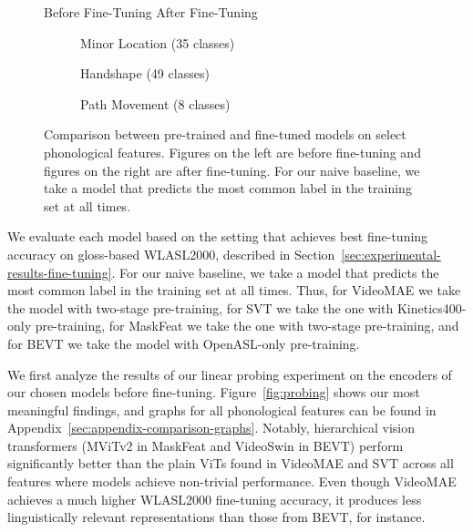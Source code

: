 \begin{figure*}
    \caption*{\hspace{0.5in} Before Fine-Tuning \hspace{2in} After Fine-Tuning}
    \begin{subfigure}[b]{\linewidth}
        \centering
        \renewcommand\sffamily{}
        
        \caption{Minor Location (35 classes)}
        \label{fig:comparison-min-loc}
    \end{subfigure}

    \begin{subfigure}[b]{\linewidth}
        \centering
        \renewcommand\sffamily{}
        
        \caption{Handshape (49 classes)}
        \label{fig:comparison-handshape}
    \end{subfigure}

    \begin{subfigure}[b]{\linewidth}
        \centering
        \renewcommand\sffamily{}
        
        \caption{Path Movement (8 classes)}
        \label{fig:comparison-path-mov}
    \end{subfigure}
    
    \centering
    \renewcommand\sffamily{}
    
    \caption{Comparison between pre-trained and fine-tuned models on select phonological features. Figures on the left are before fine-tuning and figures on the right are after fine-tuning. For our naive baseline, we take a model that predicts the most common label in the training set at all times.}
    \label{fig:comparison}
\end{figure*}

We evaluate each model based on the setting that achieves best fine-tuning accuracy on gloss-based WLASL2000, described in Section~\ref{sec:experimental-results-fine-tuning}. For our naive baseline, we take a model that predicts the most common label in the training set at all times. Thus, for VideoMAE we take the model with two-stage pre-training, for SVT we take the one with Kinetics400-only pre-training, for MaskFeat we take the one with two-stage pre-training, and for BEVT we take the model with OpenASL-only pre-training.

We first analyze the results of our linear probing experiment on the encoders of our chosen models before fine-tuning. Figure~\ref{fig:probing} shows our most meaningful findings, and graphs for all phonological features can be found in Appendix~\ref{sec:appendix-comparison-graphs}. Notably, hierarchical vision transformers (MViTv2 in MaskFeat and VideoSwin in BEVT) perform significantly better than the plain ViTs found in VideoMAE and SVT across all features where models achieve non-trivial performance. Even though VideoMAE achieves a much higher WLASL2000 fine-tuning accuracy, it produces less linguistically relevant representations than those from BEVT, for instance.


